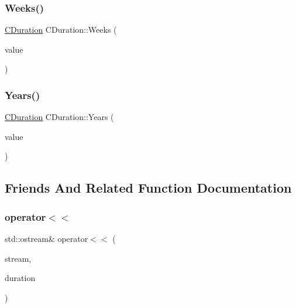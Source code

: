 \mbox{\label{class_c_duration_a76d9ed83e86188a90a4637f6441f9e4b}} 
\subsubsection{\texorpdfstring{Weeks()}{Weeks()}}
{\footnotesize\ttfamily \mbox{\hyperlink{class_c_duration}{C\+Duration}} C\+Duration\+::\+Weeks (\begin{DoxyParamCaption}\item[{long long int}]{value }\end{DoxyParamCaption})\hspace{0.3cm}{\ttfamily [static]}}

\mbox{\label{class_c_duration_a2a0a70dd3c8c7f30719e5be1609fea15}} 
\subsubsection{\texorpdfstring{Years()}{Years()}}
{\footnotesize\ttfamily \mbox{\hyperlink{class_c_duration}{C\+Duration}} C\+Duration\+::\+Years (\begin{DoxyParamCaption}\item[{long long int}]{value }\end{DoxyParamCaption})\hspace{0.3cm}{\ttfamily [static]}}



\subsection{Friends And Related Function Documentation}
\mbox{\label{class_c_duration_acbd3966012525c6563be675ce44b6c06}} 
\subsubsection{\texorpdfstring{operator$<$$<$}{operator<<}}
{\footnotesize\ttfamily std\+::ostream\& operator$<$$<$ (\begin{DoxyParamCaption}\item[{std\+::ostream \&}]{stream,  }\item[{const \mbox{\hyperlink{class_c_duration}{C\+Duration}} \&}]{duration }\end{DoxyParamCaption})\hspace{0.3cm}{\ttfamily [friend]}}



